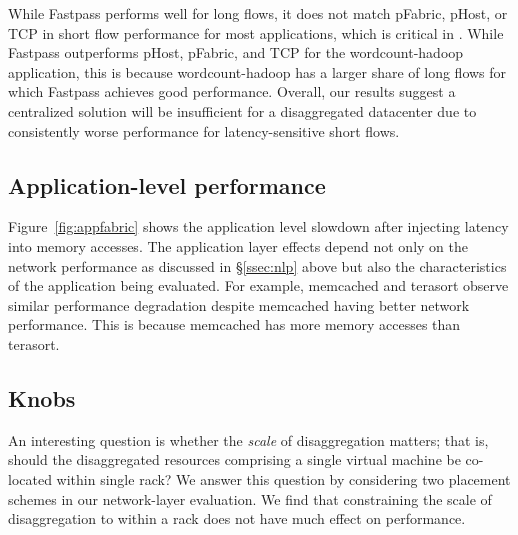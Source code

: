 While Fastpass performs well for long flows, it does not match pFabric, pHost, or TCP in short flow performance for most applications, which is critical in \dis. While Fastpass outperforms pHost, pFabric, and TCP for the wordcount-hadoop application, this is because wordcount-hadoop has a larger share of long flows for which Fastpass achieves good performance. Overall, our results suggest a centralized solution will be insufficient for a disaggregated datacenter due to consistently worse performance for latency-sensitive short flows.


\subsection{Application-level performance}
\label{ssec:alp}
Figure~\ref{fig:appfabric} shows the application level slowdown after injecting latency into memory accesses. The application layer effects depend not only on the network performance as discussed in \S\ref{ssec:nlp} above but also the characteristics of the application being evaluated. For example, memcached and terasort observe similar performance degradation despite memcached having better network performance. This is because memcached has more memory accesses than terasort. 

\subsection{Knobs}
\label{ssec:ddcArchKnob}
An interesting question is whether the \emph{scale} of disaggregation matters; that is, should the disaggregated resources comprising a single virtual machine be co-located within single rack? We answer this question by considering two placement schemes in our network-layer evaluation. We find that constraining the scale of disaggregation to within a rack does not have much effect on performance. 

